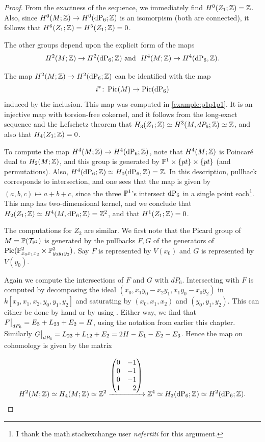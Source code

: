 \begin{proof}
From the exactness of the sequence, we immediately find $H^0(Z_1;\Z)=\Z$. Also, since $H^0(M;\Z) \to H^0(\dP6;\Z)$ is an isomorpism (both are connected), it follows that $H^6(Z_1;\Z)=H^5(Z_1;\Z)=0$.

The other groups depend upon the explicit form of the maps \[{H^2(M;\Z) \to H^2(\dP6;\Z)} \text{ and } {H^4(M;\Z) \to H^4(\dP6,\Z)}.\]

The map $H^2(M;\Z) \to H^2(\dP6;\Z)$ can be identified with the map \[{i^\ast \colon \Pic(M) \to \Pic(\dP6)}\] induced by the inclusion. This map was computed in \cref{example:p1p1p1}. It is an injective map with torsion-free cokernel, and it follows from the long-exact sequence and the Lefschetz theorem that $H_3(Z_1;\Z) \simeq H^3(M,dP_6; \Z) \simeq \Z$, and also that $H_4(Z_1;\Z)=0$.

To compute the map $H^4(M;\Z) \to H^4(\dP6;\Z)$, note that $H^4(M;\Z)$ is Poincaré dual to $H_ 2(M;\Z)$, and this group is generated by $\P^1 \times \{pt\} \times \{ pt\}$ (and permutations). Also, $H^4(\dP6;\Z) \simeq H_0(\dP6,\Z)=\Z$. In this description, pullback corresponds to intersection, and one sees that the map is given by $(a,b,c) \mapsto a+b+c$, since the three $\P^1$'s intersect $\dP6$ in a single point each\footnote{I thank the math.stackexchange user \emph{nefertiti} for this argument.}. This map has two-dimensional kernel, and we conclude that $H_2(Z_1;\Z) \simeq H^4(M,\dP6;\Z) = \Z^2$, and that $H^1(Z_1;\Z)=0$.

The computations for $Z_2$ are similar. We first note that the Picard group of $M=\P(\mathcal T_{\P^2})$ is generated by the pullbacks $F,G$ of the generators of ${\Pic(\P^2_{x_0x_1x_2} \times \P^2_{y_0y_1y_2})}$. Say $F$ is represented by $V(x_0)$ and $G$ is represented by $V(y_0)$.

Again we compute the intersections of $F$ and $G$ with $dP_6$. Intersecting with $F$ is computed by decomposing the ideal $(x_0,x_1y_0-x_2y_1,x_1y_0-x_0y_2)$ in $k[x_0,x_1,x_2,y_0,y_1,y_2]$ and saturating by $(x_0,x_1,x_2)$ and $(y_0,y_1,y_2)$. This can either be done by hand or by using \MM. Either way, we find that $\restr{F}{dP_6} = E_3+L_{23} + E_2=H$, using the notation from earlier this chapter. Similarly $\restr{G}{dP_6}=L_{23}+L_{12}+E_2=2H-E_1-E_2-E_3$. Hence the map on cohomology is given by the matrix

\[
H^2(M;\Z) \simeq H_4(M;\Z) \simeq \Z^2 \xrightarrow{
	\begin{pmatrix*}[r]
	0 & -1 \\
	0 & -1 \\
	0 & -1  \\
	1 & 2 
	\end{pmatrix*}
} \Z^4 \simeq H_2(\dP6;\Z) \simeq H^2(\dP6;\Z).
\]


\end{proof}
